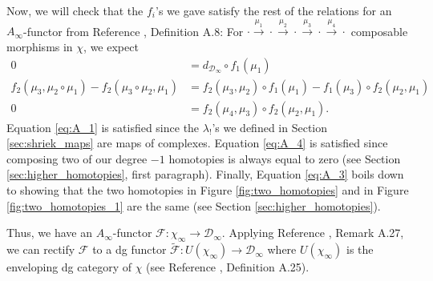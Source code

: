 %
Now, we will check that the $f_i$'s 
we gave satisfy the rest of the 
relations for an $A_\infty$-functor 
from Reference \cite{F}, Definition A.8:
For $\cdot 
\xrightarrow{\mu_1} \cdot 
\xrightarrow{\mu_2} \cdot
\xrightarrow{\mu_3} \cdot 
\xrightarrow{\mu_4} \cdot $ 
composable morphisms in $\chi$, 
we expect
\begin{align} 
0
&= 
d_{\mathcal{D}_\infty} \circ f_1(\mu_1)
\label{eq:A_1}\\
f_2(\mu_3, \mu_2 \circ \mu_1) - 
  f_2(\mu_3 \circ \mu_2, \mu_1)
&= 
f_2(\mu_3, \mu_2) \circ f_1(\mu_1) - 
  f_1(\mu_3) \circ f_2(\mu_2, \mu_1)
\label{eq:A_3}\\  
0
&= 
f_2(\mu_4, \mu_3) \circ f_2(\mu_2, \mu_1).  
\label{eq:A_4}
\end{align}
Equation \ref{eq:A_1} is satisfied 
since the $\lambda_!$'s we defined 
in Section \ref{sec:shriek_maps} are maps 
of complexes. Equation \ref{eq:A_4} is 
satisfied since composing two of our 
degree $-1$ homotopies is always equal to 
zero (see Section 
\ref{sec:higher_homotopies}, first 
paragraph). Finally, Equation \ref{eq:A_3} 
boils down to showing that the two 
homotopies in Figure \ref{fig:two_homotopies} 
and in Figure \ref{fig:two_homotopies_1} are 
the same (see Section 
\ref{sec:higher_homotopies}).

Thus, we have an $A_\infty$-functor 
$\mathcal{F}:\chi_\infty \to
\mathcal{D}_\infty$. Applying Reference 
\cite{F}, Remark A.27, we can rectify 
$\mathcal{F}$ to a dg functor 
$\tilde{\mathcal{F}}: U(\chi_\infty) \to 
\mathcal{D}_\infty$ where $U(\chi_\infty)$ 
is the enveloping dg category of $\chi$ 
(see Reference \cite{F}, Definition A.25).